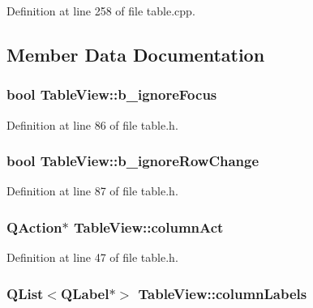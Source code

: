 Definition at line 258 of file table.cpp.



\subsection{Member Data Documentation}
\hypertarget{classTableView_a150be12afa3562146d290f26f10459b2}{
\subsubsection[{b\_\-ignoreFocus}]{\setlength{\rightskip}{0pt plus 5cm}bool {\bf TableView::b\_\-ignoreFocus}}}
\label{classTableView_a150be12afa3562146d290f26f10459b2}


Definition at line 86 of file table.h.

\hypertarget{classTableView_a20a7e1035a96ddde81059ce744099798}{
\subsubsection[{b\_\-ignoreRowChange}]{\setlength{\rightskip}{0pt plus 5cm}bool {\bf TableView::b\_\-ignoreRowChange}}}
\label{classTableView_a20a7e1035a96ddde81059ce744099798}


Definition at line 87 of file table.h.

\hypertarget{classTableView_a1808f7915f3db4bdea5fb535ecebda52}{
\subsubsection[{columnAct}]{\setlength{\rightskip}{0pt plus 5cm}QAction$\ast$ {\bf TableView::columnAct}}}
\label{classTableView_a1808f7915f3db4bdea5fb535ecebda52}


Definition at line 47 of file table.h.

\hypertarget{classTableView_a1160d50c2fd480dfd59b3d7660ef17b0}{
\subsubsection[{columnLabels}]{\setlength{\rightskip}{0pt plus 5cm}QList$<$QLabel$\ast$$>$ {\bf TableView::columnLabels}}}
\label{classTableView_a1160d50c2fd480dfd59b3d7660ef17b0}



